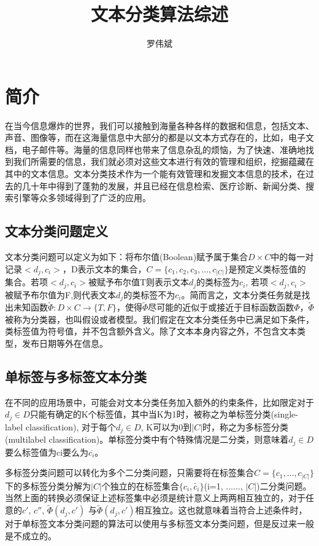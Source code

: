 \documentclass[UTF8]{ctexart}
\title{文本分类算法综述}
\author{罗伟斌}
\begin{document}
\maketitle
\section{简介}
	在当今信息爆炸的世界，我们可以接触到海量各种各样的数据和信息，包括文本、声音、图像等，而在这海量信息中大部分的都是以文本方式存在的，比如，电子文档，电子邮件等。海量的信息同样也带来了信息杂乱的烦恼，为了快速、准确地找到我们所需要的信息，我们就必须对这些文本进行有效的管理和组织，挖掘蕴藏在其中的文本信息。文本分类技术作为一个能有效管理和发掘文本信息的技术，在过去的几十年中得到了蓬勃的发展，并且已经在信息检索、医疗诊断、新闻分类、搜索引擎等众多领域得到了广泛的应用。

\subsection{文本分类问题定义}
	\par 文本分类问题可以定义为如下：将布尔值(Boolean)赋予属于集合$D×C$中的每一对记录$<d_j , c_i>$，D表示文本的集合，$C=\{c_1 , c_2 , c_3 ,\ldots , c_{|C|}\}$是预定义类标签值的集合。若项$<d_j, c_i>$被赋予布尔值T则表示文本$d_j$的类标签为$c_i$, 若项$<d_j,c_i>$被赋予布尔值为F,则代表文本$d_j$的类标签不为$c_i$。简而言之，文本分类任务就是找出未知函数$\tilde{\Phi}:D×C\to\{T,F\}$，使得$\tilde{\Phi}$尽可能的近似于或接近于目标函数函数$\Phi$，$\tilde{\Phi}$被称为分类器，也叫假设或者模型。我们假定在文本分类任务中已满足如下条件，类标签值为符号值，并不包含额外含义。除了文本本身内容之外，不包含文本类型，发布日期等外在信息。

\subsection{单标签与多标签文本分类}
	\par 在不同的应用场景中，可能会对文本分类任务加入额外的约束条件，比如限定对于$d_j\in D$只能有确定的K个标签值，其中当K为1时，被称之为单标签分类(single-label classification), 对于每个$d_j\in D$, K可以为0到$|C|$时，称之为多标签分类(multilabel classification)。单标签分类中有个特殊情况是二分类，则意味着$d_j\in D$要么标签值为ci要么为$\overline{c_i}$。
	\par 多标签分类问题可以转化为多个二分类问题，只需要将在标签集合$C=\{c_1,\ldots, c_{|C|}\}$下的多标签分类分解为$\vert C \vert$个独立的在标签集合$\{c_i, \tilde{c_i} \}$(i=1, ......, $\vert C \vert$)二分类问题。当然上面的转换必须保证上述标签集中必须是统计意义上两两相互独立的，对于任意的$c'$, $c''$, $\tilde{\Phi}(d_j, c')$
	与$\tilde{\Phi}(d_j, c')$相互独立。这也就意味着当符合上述条件时，对于单标签文本分类问题的算法可以使用与多标签文本分类问题，但是反过来一般是不成立的。
\end{document}
